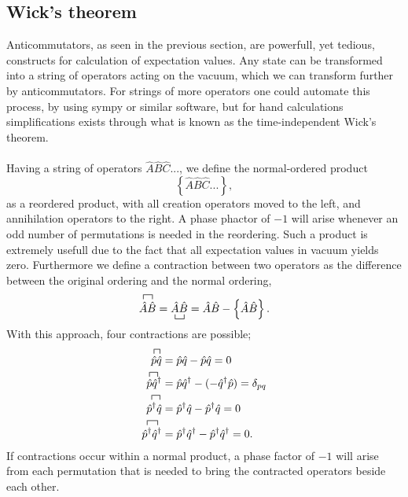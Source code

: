 \subsection{Wick's theorem}
Anticommutators, as seen in the previous section, are powerfull, yet
tedious, constructs for calculation of expectation values.
Any state can be transformed into a string of operators acting on the vacuum,
which we can transform further by anticommutators.
For strings of more operators one could automate this process, by using sympy
or similar software, but for hand
calculations simplifications exists through what is known as the time-independent Wick's theorem.

\paragraph*{}
Having a string of operators $\hat{A} \hat{B} \hat{C} ...$, we define the
normal-ordered product 
\begin{equation}
\left\lbrace  \hat{A} \hat{B} \hat{C} ...  \right\rbrace ,
\end{equation}
as a reordered product, with all creation operators moved to the left, and
annihilation operators to the right.
A phase phactor of $-1$ will arise whenever an odd number of permutations is
needed in the reordering.
Such a product is extremely usefull due to the fact that all expectation values
in vacuum yields zero.
Furthermore we define a contraction between two operators as the difference between the original
ordering and the normal ordering,
\begin{equation}
\contraction[1ex]{}{\hat{A}}{}{\hat{B}}
\hat{A}\hat{B}
=
\bcontraction[1ex]{}{\hat{A}}{}{\hat{B}}
\hat{A}\hat{B}
=
\hat{A}\hat{B} - \left\lbrace \hat{A}\hat{B} \right\rbrace .
\end{equation}
With this approach, four contractions are possible;
\begin{equation}
\label{eq:manybody:vacuumcontractions}
\begin{split}
\contraction[1ex]{}{\hat{p}}{}{\hat{q}}
\hat{p}\hat{q} &= \hat{p}\hat{q} - \hat{p}\hat{q} = 0 \\
%
\contraction[1ex]{}{\hat{p}}{}{\hat{q}^{\dagger}}
\hat{p}\hat{q}^{\dagger} &= \hat{p}\hat{q}^{\dagger} -(-\hat{q}^{\dagger}
\hat{p}) = \delta_{pq}\\
%
\contraction[1ex]{}{\hat{p}^{\dagger}}{}{\hat{q}}
\hat{p}^{\dagger}\hat{q} &= \hat{p}^{\dagger}\hat{q} - \hat{p}^{\dagger}\hat{q}
= 0\\
%
\contraction[1ex]{}{\hat{p}^{\dagger}}{}{\hat{q}^{\dagger}}
\hat{p}^{\dagger}\hat{q}^{\dagger} &= \hat{p}^{\dagger}\hat{q}^{\dagger} -
\hat{p}^{\dagger}\hat{q}^{\dagger} = 0  .
\end{split}
\end{equation}
If contractions occur within a normal product, a phase factor of $-1$ will
arise from each permutation that is needed to bring the contracted operators
beside each other.

